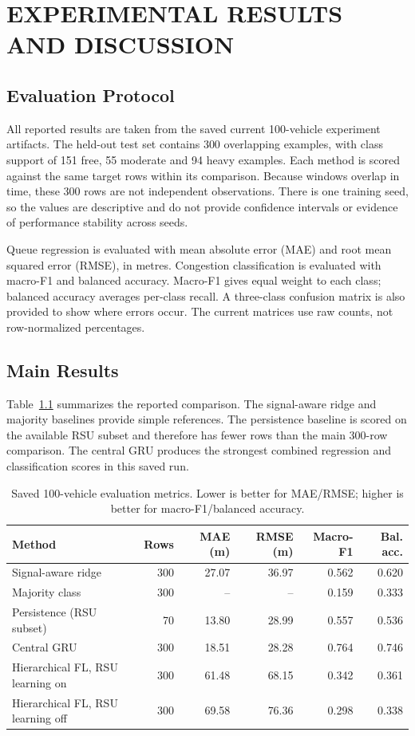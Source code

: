 \chapter{EXPERIMENTAL RESULTS AND DISCUSSION}\label{ch:results}

\section{Evaluation Protocol}
All reported results are taken from the saved current 100-vehicle experiment artifacts. The held-out test set contains 300 overlapping examples, with class support of 151 free, 55 moderate and 94 heavy examples. Each method is scored against the same target rows within its comparison. Because windows overlap in time, these 300 rows are not independent observations. There is one training seed, so the values are descriptive and do not provide confidence intervals or evidence of performance stability across seeds.

Queue regression is evaluated with mean absolute error (MAE) and root mean squared error (RMSE), in metres. Congestion classification is evaluated with macro-F1 and balanced accuracy. Macro-F1 gives equal weight to each class; balanced accuracy averages per-class recall. A three-class confusion matrix is also provided to show where errors occur. The current matrices use raw counts, not row-normalized percentages.

\section{Main Results}
Table~\ref{tab:main-results} summarizes the reported comparison. The signal-aware ridge and majority baselines provide simple references. The persistence baseline is scored on the available RSU subset and therefore has fewer rows than the main 300-row comparison. The central GRU produces the strongest combined regression and classification scores in this saved run.

\begin{table}[ht]
\centering
\caption{Saved 100-vehicle evaluation metrics. Lower is better for MAE/RMSE; higher is better for macro-F1/balanced accuracy.}
\label{tab:main-results}
\small
\setlength{\tabcolsep}{3.5pt}
\begin{tabular}{lrrrrr}
\toprule
Method & Rows & MAE (m) & RMSE (m) & Macro-F1 & Bal. acc.\\
\midrule
Signal-aware ridge & 300 & 27.07 & 36.97 & 0.562 & 0.620\\
Majority class & 300 & -- & -- & 0.159 & 0.333\\
Persistence (RSU subset) & 70 & 13.80 & 28.99 & 0.557 & 0.536\\
Central GRU & 300 & 18.51 & 28.28 & 0.764 & 0.746\\
Hierarchical FL, RSU learning on & 300 & 61.48 & 68.15 & 0.342 & 0.361\\
Hierarchical FL, RSU learning off & 300 & 69.58 & 76.36 & 0.298 & 0.338\\
\bottomrule
\end{tabular}
\end{table}

